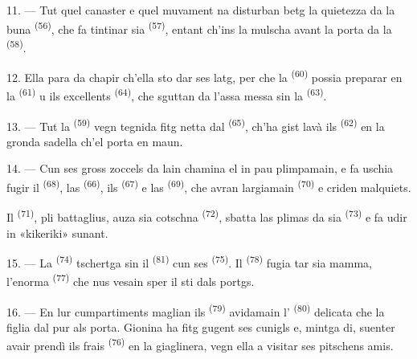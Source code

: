 11. --- Tut quel canaster e quel muvament na disturban betg la quietezza da la buna
 \textsuperscript{(56)}, che fa tintinar sia 
\textsuperscript{(57)}, entant ch'ins la mulscha avant la porta da la 
\textsuperscript{(58)}.

12. Ella para da chapir ch'ella sto dar ses latg, per che la 
\textsuperscript{(60)} possia preparar  en la 
\textsuperscript{(61)} u ils excellents  \textsuperscript{(64)}, che
sguttan da l'assa messa sin la  \textsuperscript{(63)}.

13. --- Tut la  \textsuperscript{(59)} vegn tegnida fitg netta dal
 \textsuperscript{(65)}, ch'ha gist lavà ils  \textsuperscript{(62)} en la gronda sadella ch'el porta en maun.

\VUsaut{3.0mm}
\VUsaut{3.0mm}

14. --- Cun ses gross zoccels da lain chamina el in pau plimpamain, e fa uschia fugir
il  \textsuperscript{(68)}, las  \textsuperscript{(66)},
ils  \textsuperscript{(67)} e las  \textsuperscript{(69)},
che avran largiamain  \textsuperscript{(70)} e criden malquiets.

Il  \textsuperscript{(71)}, pli battaglius, auza sia cotschna
 \textsuperscript{(72)}, sbatta las plimas da sia 
\textsuperscript{(73)} e fa udir in «kikeriki» sunant.

15. --- La  \textsuperscript{(74)} tschertga sin il
 \textsuperscript{(81)} cun ses 
\textsuperscript{(75)}. Il  \textsuperscript{(78)} fugia tar sia
mamma, l'enorma  \textsuperscript{(77)} che nus vesain sper il sti dals
portgs.

16. --- En lur cumpartiments maglian ils  \textsuperscript{(79)}
avidamain l' \textsuperscript{(80)} delicata che la figlia dal pur als
porta. Gionina ha fitg gugent ses cunigls e, mintga di, suenter avair prendì ils
frais  \textsuperscript{(76)} en la giaglinera, vegn ella a visitar ses
pitschens amis.

\VUsaut{6.0mm}
\VUfilet{22mm}
